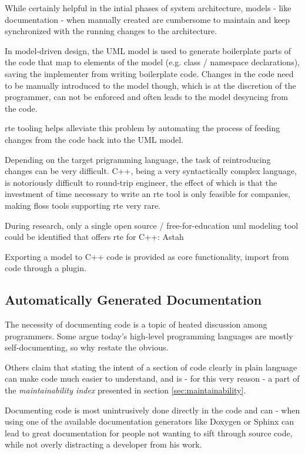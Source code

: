While certainly helpful in the intial phases of system architecture, models - like documentation - when manually created are cumbersome to maintain and keep synchronized with the running changes to the architecture.

In model-driven design, the UML model is used to generate boilerplate parts of the code that map to elements of the model (e.g. class / namespace declarations), saving the implementer from writing boilerplate code. Changes in the code need to be manually introduced to the model though, which is at the discretion of the programmer, can not be enforced and often leads to the model desyncing from the code. 

\gls{rte} tooling helps alleviate this problem by automating the process of feeding changes from the code back into the UML model.

Depending on the target prigramming language, the task of reintroducing changes can be very difficult. C++, being a very syntactically complex language, is notoriously difficult to round-trip engineer, the effect of which is that the investment of time necessary to write an \gls{rte} tool is only feasible for companies, making \gls{floss} tools supporting \gls{rte} very rare.

During research, only a single open source / free-for-education \gls{uml} modeling tool could be identified that offers \gls{rte} for C++: Astah

Exporting a model to C++ code is provided as core functionality, import from code through a plugin.

\subsection{Automatically Generated Documentation}\label{sec:resdoxygen}
The necessity of documenting code is a topic of heated discussion among programmers. Some argue today's high-level programming languages are mostly self-documenting, so why restate the obvious.

Others claim that stating the intent of a section of code clearly in plain language can make code much easier to understand, and is - for this very reason - a part of the \textit{maintainability index} presented in section \ref{sec:maintainability}.

Documenting code is most unintrusively done directly in the code and can - when using one of the available documentation generators like Doxygen or Sphinx can lead to great documentation for people not wanting to sift through source code, while not overly distracting a developer from his work.

